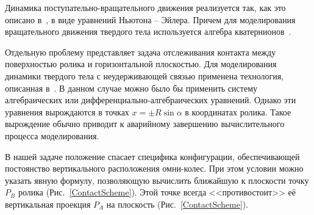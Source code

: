 %

Динамика поступательно-вращательного движения реализуется так, как это описано
в~\cite{Kosenko2007}, в виде уравнений Ньютона -- Эйлера. Причем для 
моделирования вращательного движения твердого тела используется алгебра 
кватернионов~\cite{KosenkoQuaternionRus,Kosenko1998}.

Отдельную проблему представляет задача отслеживания контакта между поверхностью 
ролика и горизонтальной плоскостью. Для моделирования динамики твердого тела с
неудерживающей связью применена технология, описанная в~\cite{Kosenko2006}. В
данном случае можно было бы применить систему алгебраических или 
дифференциально-алгебраических уравнений. Однако эти уравнения вырождаются в 
точках $x=\pm R\sin\alpha $ в координатах ролика. Такое вырождение обычно 
приводит к аварийному завершению вычислительного процесса моделирования.

В нашей задаче положение спасает специфика конфигурации, обеспечивающей 
постоянство вертикального расположения омни-колес. При этом условии можно
указать явную формулу, позволяющую вычислить ближайшую к плоскости точку $P_B$
ролика (Рис.~\ref{ContactScheme}). Этой точке всегда <<противостоит>> её 
вертикальная проекция $P_A$ на плоскость (Рис.~\ref{ContactScheme}).

